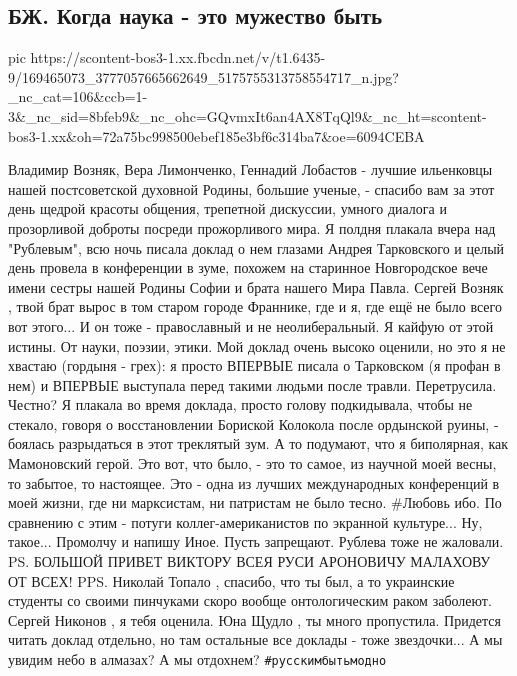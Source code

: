  
 
 
 
 
\subsection{БЖ. Когда наука - это мужество быть}
\label{sec:05_04_2021.fb.bilchenko_evgenia.6.nauka_muzhestvo}


\ifcmt
  pic https://scontent-bos3-1.xx.fbcdn.net/v/t1.6435-9/169465073_3777057665662649_5175755313758554717_n.jpg?_nc_cat=106&ccb=1-3&_nc_sid=8bfeb9&_nc_ohc=GQvmxIt6an4AX8TqQl9&_nc_ht=scontent-bos3-1.xx&oh=72a75bc998500ebef185e3bf6c314ba7&oe=6094CEBA
\fi


Владимир Возняк, Вера Лимонченко, Геннадий Лобастов - лучшие ильенковцы нашей постсоветской духовной Родины, большие ученые, - спасибо вам за этот день щедрой красоты общения, трепетной дискуссии, умного диалога и прозорливой доброты посреди прожорливого мира. 
Я полдня плакала вчера над "Рублевым", всю ночь писала доклад о нем глазами Андрея Тарковского и целый день провела в конференции в зуме, похожем на старинное Новгородское вече имени сестры нашей Родины Софии и брата нашего Мира Павла.
Сергей Возняк
 , твой брат вырос в том старом городе Франнике, где и я, где ещё не было всего вот этого... И он тоже - православный и не неолиберальный. Я кайфую от этой истины. От науки, поэзии, этики. Мой доклад очень высоко оценили, но это я не хвастаю (гордыня - грех): я просто ВПЕРВЫЕ писала о Тарковском (я профан в нем) и ВПЕРВЫЕ выступала перед такими людьми после травли. Перетрусила.
Честно? Я плакала во время доклада, просто голову подкидывала, чтобы не стекало, говоря о восстановлении Бориской Колокола после ордынской руины, - боялась разрыдаться в этот треклятый зум. А то подумают, что я биполярная, как Мамоновский герой.
Это вот, что было, - это то самое, из научной моей весны, то забытое, то настоящее. Это - одна из лучших международных конференций в моей жизни, где ни марксистам, ни патристам не было тесно. #Любовь ибо. По сравнению с этим - потуги коллег-американистов по экранной культуре... Ну, такое... Промолчу и напишу Иное. Пусть запрещают. Рублева тоже не жаловали.
PS. БОЛЬШОЙ ПРИВЕТ ВИКТОРУ ВСЕЯ РУСИ АРОНОВИЧУ МАЛАХОВУ ОТ ВСЕХ! 
PPS. Николай Топало
  , спасибо, что ты был, а то украинские студенты со своими пинчуками скоро вообще онтологическим раком заболеют. Сергей Никонов
 , я тебя оценила. Юна Щудло
 , ты много пропустила. Придется читать доклад отдельно, но там остальные все доклады - тоже звездочки... А мы увидим небо в алмазах? А мы отдохнем? \verb|#русскимбытьмодно|

